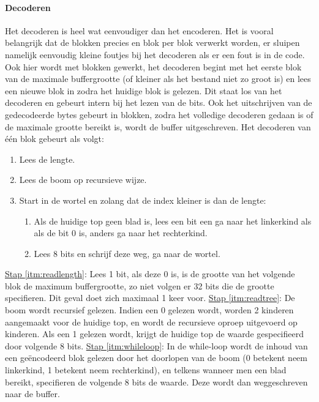 \documentclass[11pt, a4paper]{article}
\begin{document}
\paragraph{Decoderen}
Het decoderen is heel wat eenvoudiger dan het encoderen. Het is vooral belangrijk dat de blokken precies en blok per blok verwerkt worden, er sluipen namelijk eenvoudig kleine foutjes bij het decoderen als er een fout is in de code. Ook hier wordt met blokken gewerkt, het decoderen begint met het eerste blok van de maximale buffergrootte (of kleiner als het bestand niet zo groot is) en lees een nieuwe blok in zodra het huidige blok is gelezen. Dit staat los van het decoderen en gebeurt intern bij het lezen van de bits. Ook het uitschrijven van de gedecodeerde bytes gebeurt in blokken, zodra het volledige decoderen gedaan is of de maximale grootte bereikt is, wordt de buffer uitgeschreven. Het decoderen van \'{e}\'{e}n blok gebeurt als volgt:
\begin{enumerate}
	\item \label{itm:readlength} Lees de lengte.
	\item \label{itm:readtree} Lees de boom op recursieve wijze. 
	\item \label{itm:whileloop} Start in de wortel en zolang dat de index kleiner is dan de lengte: 
	\begin{enumerate}
		\item \label{itm:readonebit} Als de huidige top geen blad is, lees een bit een ga naar het linkerkind als als de bit 0 is, anders ga naar het rechterkind.
		\item \label{itm:readeightbit} Lees 8 bits en schrijf deze weg, ga naar de wortel.
	\end{enumerate}
\end{enumerate}	
\underline{Stap \ref{itm:readlength}}: 
Lees 1 bit, als deze 0 is, is de grootte van het volgende blok de maximum buffergrootte, zo niet volgen er 32 bits die de grootte specifieren. Dit geval doet zich maximaal 1 keer voor. 
\newline\underline{Stap \ref{itm:readtree}}:
De boom wordt recursief gelezen. Indien een 0 gelezen wordt, worden 2 kinderen aangemaakt voor de huidige top, en wordt de recursieve oproep uitgevoerd op kinderen. Als een 1 gelezen wordt, krijgt de huidige top de waarde gespecifieerd door volgende 8 bits. 
\newline\underline{Stap \ref{itm:whileloop}}:
In de while-loop wordt de inhoud van een ge\"{e}ncodeerd blok gelezen door het doorlopen van de boom (0 betekent neem linkerkind, 1 betekent neem rechterkind), en telkens wanneer men een blad bereikt, specifieren de volgende 8 bits de waarde. Deze wordt dan weggeschreven naar de buffer. 
\end{document}
